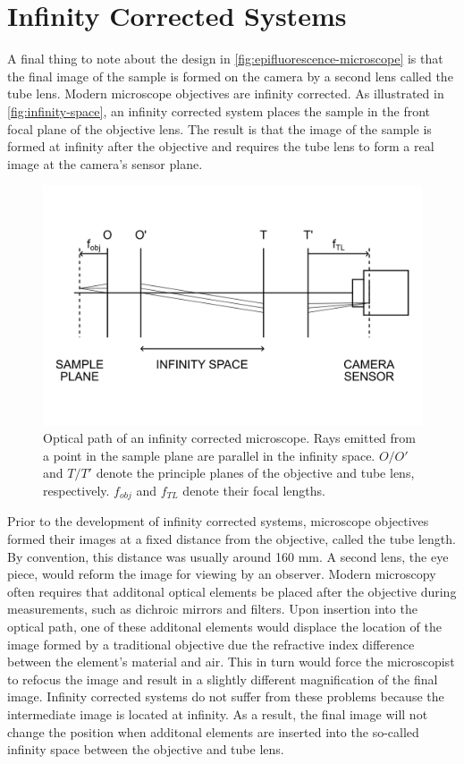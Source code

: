 \documentclass[10pt,a4paper]{book}
\begin{document}
\section{Infinity Corrected Systems}

A final thing to note about the design in \autoref{fig:epifluorescence-microscope} is that the final image of the sample is formed on the camera by a second lens called the tube lens. Modern microscope objectives are infinity corrected. As illustrated in \autoref{fig:infinity-space}, an infinity corrected system places the sample in the front focal plane of the objective lens. The result is that the image of the sample is formed at infinity after the objective and requires the tube lens to form a real image at the camera's sensor plane.

\begin{figure}[ht]
    \centering
    \includegraphics{infinity-space.png}
    \caption{Optical path of an infinity corrected microscope. Rays emitted from a point in the sample plane are parallel in the infinity space. $O/O'$ and $T/T'$ denote the principle planes of the objective and tube lens, respectively. $f_{obj}$ and $f_{TL}$ denote their focal lengths.}
    \label{fig:infinity-space}
\end{figure}

Prior to the development of infinity corrected systems, microscope objectives formed their images at a fixed distance from the objective, called the tube length. By convention, this distance was usually around 160 mm. A second lens, the eye piece, would reform the image for viewing by an observer. Modern microscopy often requires that additonal optical elements be placed after the objective during measurements, such as dichroic mirrors and filters. Upon insertion into the optical path, one of these additonal elements would displace the location of the image formed by a traditional objective due the refractive index difference between the element's material and air. This in turn would force the microscopist to refocus the image and result in a slightly different magnification of the final image. Infinity corrected systems do not suffer from these problems because the intermediate image is located at infinity. As a result, the final image will not change the position when additonal elements are inserted into the so-called infinity space between the objective and tube lens.
\end{document}
